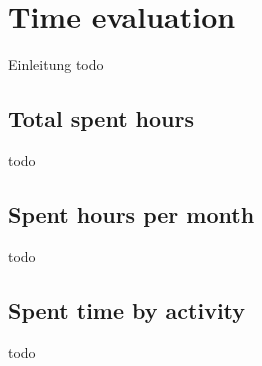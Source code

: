 \chapter{Time evaluation}
Einleitung todo

\section{Total spent hours}
todo

\section{Spent hours per month}
todo

\section{Spent time by activity}
todo